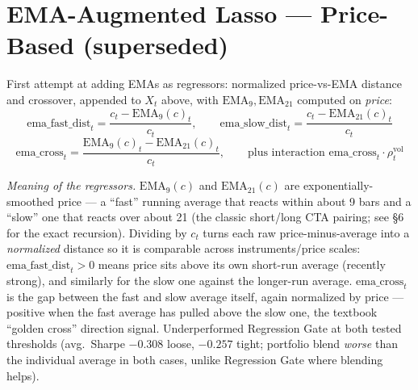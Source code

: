 \documentclass[11pt]{article}
\newcommand{\meaningpar}[1]{\par\noindent\textit{Meaning of the regressors.} #1}
\begin{document}
\section{EMA-Augmented Lasso --- Price-Based (superseded)}
First attempt at adding EMAs as regressors: normalized price-vs-EMA distance and crossover,
appended to $X_t$ above, with $\mathrm{EMA}_9,\mathrm{EMA}_{21}$ computed on \emph{price}:
\[
\mathrm{ema\_fast\_dist}_t = \frac{c_t - \mathrm{EMA}_9(c)_t}{c_t}, \qquad
\mathrm{ema\_slow\_dist}_t = \frac{c_t - \mathrm{EMA}_{21}(c)_t}{c_t}
\]
\[
\mathrm{ema\_cross}_t = \frac{\mathrm{EMA}_9(c)_t - \mathrm{EMA}_{21}(c)_t}{c_t}, \qquad
\text{plus interaction } \mathrm{ema\_cross}_t \cdot \rho^{\mathrm{vol}}_t
\]
\meaningpar{$\mathrm{EMA}_9(c)$ and $\mathrm{EMA}_{21}(c)$ are exponentially-smoothed price ---
a ``fast'' running average that reacts within about 9 bars and a ``slow'' one that reacts over
about 21 (the classic short/long CTA pairing; see \S6 for the exact recursion). Dividing by
$c_t$ turns each raw price-minus-average into a \emph{normalized} distance so it is comparable
across instruments/price scales: $\mathrm{ema\_fast\_dist}_t>0$ means price sits above its own
short-run average (recently strong), and similarly for the slow one against the longer-run
average. $\mathrm{ema\_cross}_t$ is the gap between the fast and slow average itself, again
normalized by price --- positive when the fast average has pulled above the slow one, the
textbook ``golden cross'' direction signal. Underperformed Regression Gate at both tested
thresholds (avg.\ Sharpe $-0.308$ loose, $-0.257$ tight; portfolio blend \emph{worse} than the
individual average in both cases, unlike Regression Gate where blending helps).}
\end{document}
